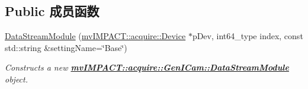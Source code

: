\subsection*{Public 成员函数}
\begin{DoxyCompactItemize}
\item 
\hyperlink{classmv_i_m_p_a_c_t_1_1acquire_1_1_gen_i_cam_1_1_data_stream_module_a00c7d97f96b849f43663dbb85e5dedf2}{Data\+Stream\+Module} (\hyperlink{classmv_i_m_p_a_c_t_1_1acquire_1_1_device}{mv\+I\+M\+P\+A\+C\+T\+::acquire\+::\+Device} $\ast$p\+Dev, int64\+\_\+type index, const std\+::string \&setting\+Name=\char`\"{}Base\char`\"{})
\begin{DoxyCompactList}\small\item\em Constructs a new {\bfseries \hyperlink{classmv_i_m_p_a_c_t_1_1acquire_1_1_gen_i_cam_1_1_data_stream_module}{mv\+I\+M\+P\+A\+C\+T\+::acquire\+::\+Gen\+I\+Cam\+::\+Data\+Stream\+Module}} object. \end{DoxyCompactList}\end{DoxyCompactItemize}
